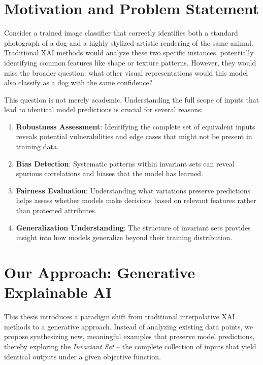 \documentclass[licencjacka,en]{pracamgr}
\begin{document}
\section{Motivation and Problem Statement}

Consider a trained image classifier that correctly identifies both a standard photograph of a dog and a highly stylized artistic rendering of the same animal. Traditional XAI methods would analyze these two specific instances, potentially identifying common features like shape or texture patterns. However, they would miss the broader question: what other visual representations would this model also classify as a dog with the same confidence?

This question is not merely academic. Understanding the full scope of inputs that lead to identical model predictions is crucial for several reasons:

\begin{enumerate}
\item \textbf{Robustness Assessment}: Identifying the complete set of equivalent inputs reveals potential vulnerabilities and edge cases that might not be present in training data.

\item \textbf{Bias Detection}: Systematic patterns within invariant sets can reveal spurious correlations and biases that the model has learned.

\item \textbf{Fairness Evaluation}: Understanding what variations preserve predictions helps assess whether models make decisions based on relevant features rather than protected attributes.

\item \textbf{Generalization Understanding}: The structure of invariant sets provides insight into how models generalize beyond their training distribution.
\end{enumerate}

\section{Our Approach: Generative Explainable AI}

This thesis introduces a paradigm shift from traditional interpolative XAI methods to a generative approach. Instead of analyzing existing data points, we propose synthesizing new, meaningful examples that preserve model predictions, thereby exploring the \textit{Invariant Set} -- the complete collection of inputs that yield identical outputs under a given objective function.
\end{document}
